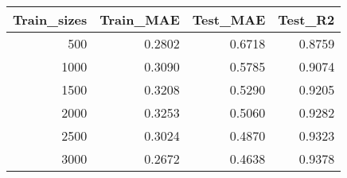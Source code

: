 \begin{tabular}{rrrr}
\toprule
Train_sizes & Train_MAE & Test_MAE & Test_R2 \\
\midrule
500 & 0.2802 & 0.6718 & 0.8759 \\
1000 & 0.3090 & 0.5785 & 0.9074 \\
1500 & 0.3208 & 0.5290 & 0.9205 \\
2000 & 0.3253 & 0.5060 & 0.9282 \\
2500 & 0.3024 & 0.4870 & 0.9323 \\
3000 & 0.2672 & 0.4638 & 0.9378 \\
\bottomrule
\end{tabular}
